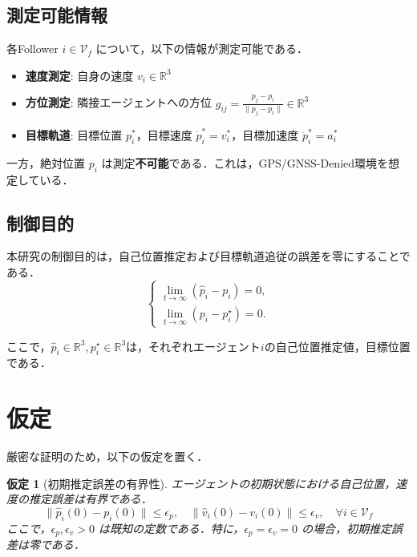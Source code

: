 \documentclass[a4paper]{jarticle}
\newtheorem{assumption}{仮定}[section]
\theoremstyle{definition}
\theoremstyle{remark}
\numberwithin{equation}{section}
\begin{document}
	\subsection{測定可能情報}
	
	各Follower $i \in \mathcal{V}_f$ について，以下の情報が測定可能である．
	\begin{itemize}
		\item \textbf{速度測定}: 自身の速度 $v_i \in \mathbb{R}^3$
		\item \textbf{方位測定}: 隣接エージェントへの方位 $g_{ij} = \frac{p_j - p_i}{\|p_j - p_i\|} \in \mathbb{R}^3$
		\item \textbf{目標軌道}: 目標位置 $p_i^*$，目標速度 $\dot{p}_i^* = v_i^*$，目標加速度 $\ddot{p}_i^* = a_i^*$
	\end{itemize}
	
	一方，絶対位置 $p_i$ は測定\textbf{不可能}である．これは，GPS/GNSS-Denied環境を想定している．
	
	\subsection{制御目的}
	
	本研究の制御目的は，自己位置推定および目標軌道追従の誤差を零にすることである．
	\begin{equation}
		\begin{cases}
			\lim_{t \to \infty} (\hat{{p}}_{i} -{p}_{i}) = {0}, \\
			\lim_{t \to \infty} ({p}_{i} - {p}_{i}^\star) = {0}.
		\end{cases}
		\label{eq:objective}
	\end{equation}
	
	ここで，$\hat{{p}}_{i}\in \mathbb{R}^{3}, {p}_{i}^\star \in \mathbb{R}^{3}$は，それぞれエージェント$i$の自己位置推定値，目標位置である．	
	
	\section{仮定}
	
	厳密な証明のため，以下の仮定を置く．
	
	\begin{screen}
		\begin{assumption}[初期推定誤差の有界性]
			エージェントの初期状態における自己位置，速度の推定誤差は有界である．
			\begin{equation}
				\|\hat{p}_i(0) - p_i(0)\| \le \epsilon_p, \quad \|\hat{v}_i(0) - v_i(0)\| \le \epsilon_v, \quad \forall i \in \mathcal{V}_f
				\label{eq:initial_condition}
			\end{equation}
			ここで，$\epsilon_p, \epsilon_v > 0$ は既知の定数である．特に，$\epsilon_p = \epsilon_v = 0$ の場合，初期推定誤差は零である．
			\label{asp:initial}
		\end{assumption}
	\end{screen}
	
\end{document}
